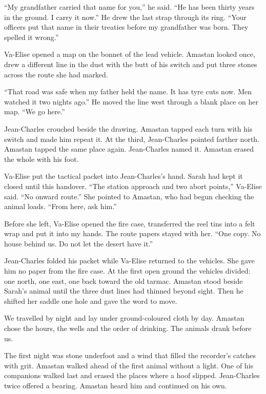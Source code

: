``My grandfather carried that name for you,'' he said. ``He has been thirty years in the ground. I carry it now.'' He drew the last strap through its ring. ``Your officers put that name in their treaties before my grandfather was born. They spelled it wrong.''\par

Va-Elise opened a map on the bonnet of the lead vehicle. Amastan looked once, drew a different line in the dust with the butt of his switch and put three stones across the route she had marked.\par

``That road was safe when my father held the name. It has tyre cuts now. Men watched it two nights ago.'' He moved the line west through a blank place on her map. ``We go here.''\par

Jean-Charles crouched beside the drawing. Amastan tapped each turn with his switch and made him repeat it. At the third, Jean-Charles pointed farther north. Amastan tapped the same place again. Jean-Charles named it. Amastan erased the whole with his foot.\par

Va-Elise put the tactical packet into Jean-Charles's hand. Sarah had kept it closed until this handover. ``The station approach and two abort points,'' Va-Elise said. ``No onward route.'' She pointed to Amastan, who had begun checking the animal loads. ``From here, ask him.''\par

Before she left, Va-Elise opened the fire case, transferred the reel tins into a felt wrap and put it into my hands. The route papers stayed with her. ``One copy. No house behind us. Do not let the desert have it.''\par

Jean-Charles folded his packet while Va-Elise returned to the vehicles. She gave him no paper from the fire case. At the first open ground the vehicles divided: one north, one east, one back toward the old tarmac. Amastan stood beside Sarah's animal until the three dust lines had thinned beyond sight. Then he shifted her saddle one hole and gave the word to move.\par

We travelled by night and lay under ground-coloured cloth by day. Amastan chose the hours, the wells and the order of drinking. The animals drank before us.\par

The first night was stone underfoot and a wind that filled the recorder's catches with grit. Amastan walked ahead of the first animal without a light. One of his companions walked last and erased the places where a hoof slipped. Jean-Charles twice offered a bearing. Amastan heard him and continued on his own.\par

